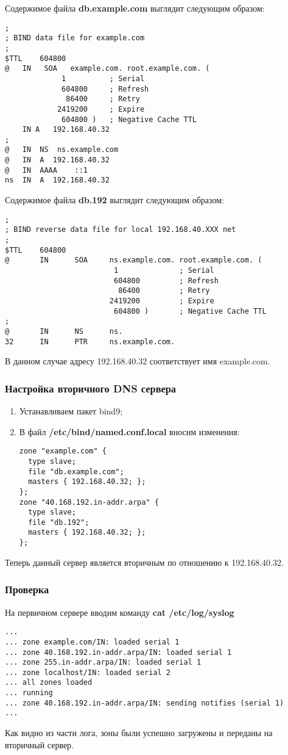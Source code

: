 \documentclass[a4paper, 12pt]{article}		%
\begin{document}
Содержимое файла \textbf{db.example.com} выглядит следующим образом:
\begin{lstlisting}[language={}]
;
; BIND data file for example.com
;
$TTL    604800
@   IN   SOA   example.com. root.example.com. (
             1          ; Serial
             604800     ; Refresh
              86400     ; Retry
            2419200     ; Expire
             604800 )   ; Negative Cache TTL
    IN A   192.168.40.32
;
@   IN  NS  ns.example.com
@   IN  A  192.168.40.32
@   IN  AAAA    ::1
ns  IN  A  192.168.40.32
\end{lstlisting}

Содержимое файла \textbf{db.192} выглядит следующим образом:
\begin{lstlisting}[language={}]
;
; BIND reverse data file for local 192.168.40.XXX net
;
$TTL    604800
@       IN      SOA     ns.example.com. root.example.com. (
                         1              ; Serial
                         604800         ; Refresh
                          86400         ; Retry
                        2419200         ; Expire
                         604800 )       ; Negative Cache TTL
;
@       IN      NS      ns.
32      IN      PTR     ns.example.com.
\end{lstlisting}
В данном случае адресу 192.168.40.32 соответствует имя example.com. 

\subsubsection{Настройка вторичного DNS сервера}
\begin{enumerate}
\item Устанавливаем пакет bind9;
\item В файл \textbf{/etc/bind/named.conf.local} вносим изменения:
\begin{lstlisting}[language={}]
zone "example.com" {
  type slave;
  file "db.example.com";
  masters { 192.168.40.32; };
};        
zone "40.168.192.in-addr.arpa" {
  type slave;
  file "db.192";
  masters { 192.168.40.32; };
};
\end{lstlisting}
\end{enumerate}
Теперь данный сервер является вторичным по отношению к 192.168.40.32.

\subsubsection{Проверка}
На первичном сервере вводим команду \textbf{cat /etc/log/syslog}
\begin{lstlisting}[language={}]
...
... zone example.com/IN: loaded serial 1
... zone 40.168.192.in-addr.arpa/IN: loaded serial 1
... zone 255.in-addr.arpa/IN: loaded serial 1
... zone localhost/IN: loaded serial 2
... all zones loaded
... running
... zone 40.168.192.in-addr.arpa/IN: sending notifies (serial 1)
...
\end{lstlisting}
Как видно из части лога, зоны были успешно загружены и переданы на вторичный сервер.
\end{document}
